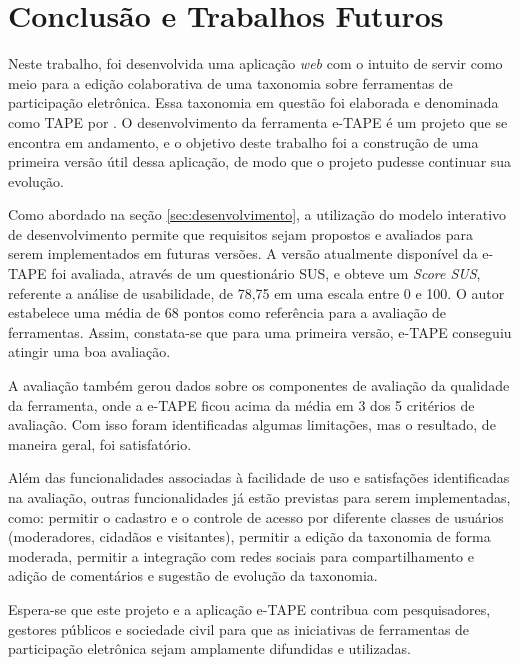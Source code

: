 \chapter[Conclusão e Trabalhos Futuros]{Conclusão e Trabalhos Futuros}
\label{cap:cap5}

Neste trabalho, foi desenvolvida uma aplicação \textit{web} com o intuito de servir como meio para a edição colaborativa de uma taxonomia
sobre ferramentas de participação eletrônica. Essa taxonomia em questão foi elaborada e denominada como TAPE por . 
O desenvolvimento da ferramenta e-TAPE é um projeto que se encontra em andamento, e o objetivo deste trabalho foi a construção de uma primeira versão útil dessa aplicação, 
de modo que o projeto pudesse continuar sua evolução.

\par
Como abordado na seção \ref{sec:desenvolvimento}, a utilização do modelo interativo de desenvolvimento permite que requisitos sejam propostos e avaliados para serem
implementados em futuras versões. A versão atualmente disponível da e-TAPE foi avaliada, através de um questionário SUS, e obteve um \textit{Score SUS}, referente a análise de usabilidade,
de 78,75 em uma escala entre 0 e 100. O autor  estabelece uma média de 68 pontos como referência para a avaliação de ferramentas. 
Assim, constata-se que para uma primeira versão, e-TAPE conseguiu atingir uma boa avaliação. 

\par
A avaliação também gerou dados sobre os componentes de avaliação da qualidade da ferramenta, onde a e-TAPE ficou acima da média em 3 dos 5 critérios de avaliação. Com isso foram
identificadas algumas limitações, mas o resultado, de maneira geral, foi satisfatório. 

\par
Além das funcionalidades associadas à facilidade de uso e satisfações identificadas na avaliação, outras funcionalidades já estão previstas para serem implementadas, como: 
permitir o cadastro e o controle de acesso por diferente classes de usuários (moderadores, cidadãos e visitantes), permitir a edição da taxonomia de forma moderada, 
permitir a integração com redes sociais para compartilhamento e adição de comentários e sugestão de evolução da taxonomia. 


\par
Espera-se que este projeto e a aplicação e-TAPE contribua com pesquisadores, gestores públicos e sociedade civil para que as iniciativas de ferramentas de participação eletrônica
sejam amplamente difundidas e utilizadas. 

